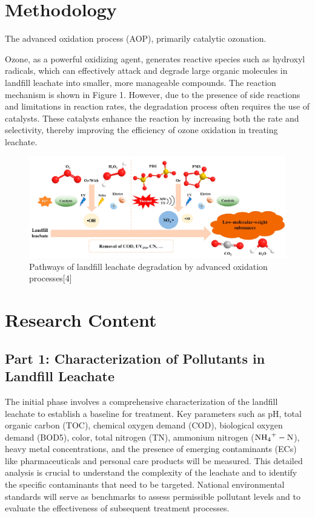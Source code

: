 \documentclass[a4paper]{article}
\begin{document}
\section{Methodology}

The advanced oxidation process (AOP), primarily catalytic ozonation.

Ozone, as a powerful oxidizing agent, generates reactive species such as hydroxyl radicals, which can effectively attack and degrade large organic molecules in landfill leachate into smaller, more manageable compounds. The reaction mechanism is shown in Figure 1. However, due to the presence of side reactions and limitations in reaction rates, the degradation process often requires the use of catalysts. These catalysts enhance the reaction by increasing both the rate and selectivity, thereby improving the efficiency of ozone oxidation in treating leachate.
\begin{figure}[htb]
    \centering
    \includegraphics[width = .8\textwidth]{plan-1.png}
    \caption{Pathways of landfill leachate degradation by advanced oxidation processes[4]}
\end{figure}
\section{Research Content}
\subsection*{Part 1: Characterization of Pollutants in Landfill Leachate}

The initial phase involves a comprehensive characterization of the
landfill leachate to establish a baseline for treatment. Key parameters
such as pH, total organic carbon (TOC), chemical oxygen demand (COD),
biological oxygen demand (BOD5), color, total nitrogen (TN), ammonium
nitrogen ($\ce{NH4+}-\ce{N}$), heavy metal concentrations, and the presence of
emerging contaminants (ECs) like pharmaceuticals and personal care
products will be measured. This detailed analysis is crucial to
understand the complexity of the leachate and to identify the specific
contaminants that need to be targeted. National environmental standards
will serve as benchmarks to assess permissible pollutant levels and to
evaluate the effectiveness of subsequent treatment processes.
\end{document}

